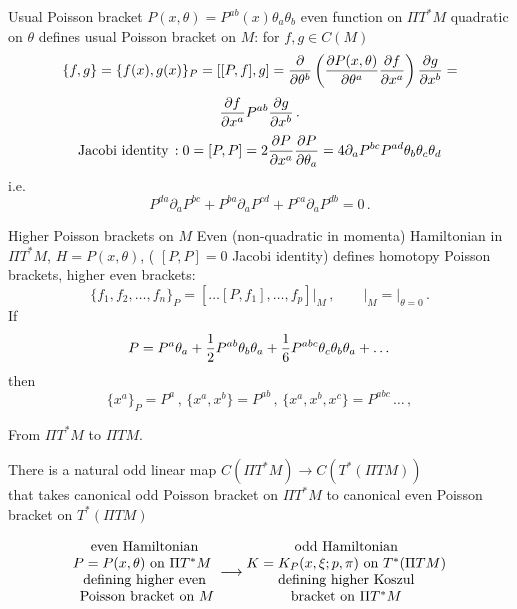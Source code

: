 \documentclass{beamer}
\def\p{\partial}
\def\p {\partial}
\begin{document}
\begin{frame}{Usual Poisson bracket}
     $P(x,\theta)=P^{ab}(x)\theta_a\theta_b$
   even function on $\Pi T^*M$ quadratic on $\theta$ defines
usual Poisson bracket on $M$:
for $f,g\in C(M)$ 
                 $$
\{f,g\}=\{f(x),g(x)\}_P=[[P,f],g]=
{\p \over \p \theta^b}
\left({\p P(x,\theta)\over \p \theta^a}{\p f\over \p x^a}\right)
    {\p g\over \p x^b}=
               $$
               $$
{\p f\over \p x^a}P^{ab}{\p g\over \p x^b}\,.
                 $$ 
$$
\hbox{Jacobi identity}\,
:0=[P,P]=2{\p P\over \p x^a}{\p P\over \p \theta_a}=
  4\p_a P^{bc}P^{ad}\theta_b\theta_c\theta_d
                $$
i.e.
                $$
     P^{da}\p_a P^{bc}+P^{ba}\p_a P^{cd}+P^{ca}\p_a P^{db}=0\,.
                $$
\end{frame}
\begin{frame}{Higher Poisson brackets on $M$}
Even  (non-quadratic in momenta) Hamiltonian in $\Pi T^*M$,  
$H=P(x,\theta)$, ( $[P,P]=0$ Jacobi identity)
defines homotopy Poisson brackets, higher even brackets:
           $$
        \{f_1,f_2,\dots,f_n\}_P=
  \left[\dotsc\left[P,f_1\right],\dots,f_p\right]\big\vert_M\,,\qquad
          \big\vert_M=\big\vert_{\theta=0}\,.
           $$
If   
       $$
P=P^a\theta_a+{1\over 2}P^{ab}\theta_b\theta_a+
     {1\over 6}P^{abc}\theta_c\theta_b\theta_a+\dots
            $$
then  
          $$
\{x^a\}_P=P^a\,,\,\{x^a,x^b\}=P^{ab}\,,\,\{x^a,x^b,x^c\}=P^{abc}\,\dots\,,
            $$
\end{frame}




\begin{frame}{From $\Pi T^*M$ to $\Pi TM$.  }
\begin{theorem}
 There is a natural odd linear map
           $
       C(\Pi T^*M)\to   C(T^*(\Pi TM)) 
           $\\ 
that takes canonical odd Poisson bracket on $\Pi T^*M$ to
canonical even  Poisson bracket on $T^*(\Pi TM)$ 
\end{theorem}

\begin{corollary}
   $$
 \begin{matrix}
\hbox{even  Hamiltonian}\cr
  \hbox{$P=P(x,\theta)$ on $\Pi T^*M$ }\cr
\hbox{defining higher even}\cr
  \hbox{ Poisson bracket on $M$}
\end{matrix}
   \longrightarrow
 \begin{matrix}
\hbox{odd  Hamiltonian}\cr
 \hbox{$K=K_P(x,\xi;p,\pi)$ on $T^*(\Pi TM)$} \cr
\hbox{defining higher Koszul}\cr
  \hbox{bracket on $\Pi T^*M$}
\end{matrix}
  $$
\end{corollary}


\end{frame}
\end{document}
